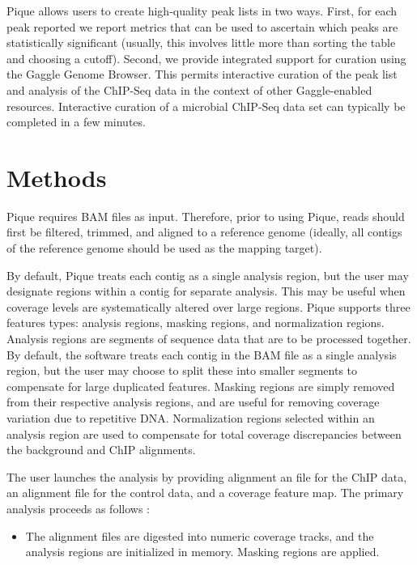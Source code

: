 \begin{refsection}
Pique allows users to create high-quality peak lists in two ways.
First, for each peak reported we report metrics that can be used to
ascertain which peaks are statistically significant (usually, this
involves little more than sorting the table and choosing a
cutoff). Second, we provide integrated support for curation using the
Gaggle Genome Browser. \cite{gaggle_browser} This permits interactive
curation of the peak list and analysis of the ChIP-Seq data in the
context of other Gaggle-enabled resources. \cite{firegoose, gaggle}
Interactive curation of a microbial ChIP-Seq data set can typically be
completed in a few minutes.

\section{Methods}

\noindent Pique requires BAM files as input\cite{sam_format}.
Therefore, prior to using Pique, reads should first be filtered,
trimmed, and aligned to a reference genome (ideally, all contigs of
the reference genome should be used as the mapping target).

By default, Pique treats each contig as a single analysis region, but
the user may designate regions within a contig for separate analysis.
This may be useful when coverage levels are systematically altered
over large regions.  Pique supports three features types: analysis
regions, masking regions, and normalization regions. Analysis regions
are segments of sequence data that are to be processed together. By
default, the software treats each contig in the BAM file as a single
analysis region, but the user may choose to split these into smaller
segments to compensate for large duplicated features. Masking regions
are simply removed from their respective analysis regions, and are
useful for removing coverage variation due to repetitive DNA.
Normalization regions selected within an analysis region are used to
compensate for total coverage discrepancies between the background and
ChIP alignments.

The user launches the analysis by providing alignment an file for the
ChIP data, an alignment file for the control data, and a coverage
feature map. The primary analysis proceeds as follows :

\begin{itemize}

\item The alignment files are digested into numeric coverage tracks,
  and the analysis regions are initialized in memory. Masking regions
  are applied.


\end{itemize}
\end{refsection}
